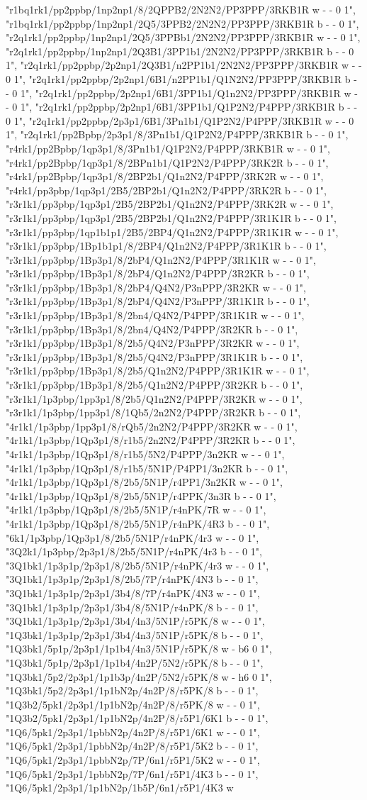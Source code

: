\documentclass[11pt,a4paper]{article}
\begin{document}
"r1bq1rk1/pp2ppbp/1np2np1/8/2QPPB2/2N2N2/PP3PPP/3RKB1R w - - 0 1", "r1bq1rk1/pp2ppbp/1np2np1/2Q5/3PPB2/2N2N2/PP3PPP/3RKB1R b - - 0 1", "r2q1rk1/pp2ppbp/1np2np1/2Q5/3PPBb1/2N2N2/PP3PPP/3RKB1R w - - 0 1", "r2q1rk1/pp2ppbp/1np2np1/2Q3B1/3PP1b1/2N2N2/PP3PPP/3RKB1R b - - 0 1", "r2q1rk1/pp2ppbp/2p2np1/2Q3B1/n2PP1b1/2N2N2/PP3PPP/3RKB1R w - - 0 1", "r2q1rk1/pp2ppbp/2p2np1/6B1/n2PP1b1/Q1N2N2/PP3PPP/3RKB1R b - - 0 1", "r2q1rk1/pp2ppbp/2p2np1/6B1/3PP1b1/Q1n2N2/PP3PPP/3RKB1R w - - 0 1", "r2q1rk1/pp2ppbp/2p2np1/6B1/3PP1b1/Q1P2N2/P4PPP/3RKB1R b - - 0 1", "r2q1rk1/pp2ppbp/2p3p1/6B1/3Pn1b1/Q1P2N2/P4PPP/3RKB1R w - - 0 1", "r2q1rk1/pp2Bpbp/2p3p1/8/3Pn1b1/Q1P2N2/P4PPP/3RKB1R b - - 0 1", "r4rk1/pp2Bpbp/1qp3p1/8/3Pn1b1/Q1P2N2/P4PPP/3RKB1R w - - 0 1", "r4rk1/pp2Bpbp/1qp3p1/8/2BPn1b1/Q1P2N2/P4PPP/3RK2R b - - 0 1", "r4rk1/pp2Bpbp/1qp3p1/8/2BP2b1/Q1n2N2/P4PPP/3RK2R w - - 0 1", "r4rk1/pp3pbp/1qp3p1/2B5/2BP2b1/Q1n2N2/P4PPP/3RK2R b - - 0 1", "r3r1k1/pp3pbp/1qp3p1/2B5/2BP2b1/Q1n2N2/P4PPP/3RK2R w - - 0 1", "r3r1k1/pp3pbp/1qp3p1/2B5/2BP2b1/Q1n2N2/P4PPP/3R1K1R b - - 0 1", "r3r1k1/pp3pbp/1qp1b1p1/2B5/2BP4/Q1n2N2/P4PPP/3R1K1R w - - 0 1", "r3r1k1/pp3pbp/1Bp1b1p1/8/2BP4/Q1n2N2/P4PPP/3R1K1R b - - 0 1", "r3r1k1/pp3pbp/1Bp3p1/8/2bP4/Q1n2N2/P4PPP/3R1K1R w - - 0 1", "r3r1k1/pp3pbp/1Bp3p1/8/2bP4/Q1n2N2/P4PPP/3R2KR b - - 0 1", "r3r1k1/pp3pbp/1Bp3p1/8/2bP4/Q4N2/P3nPPP/3R2KR w - - 0 1", "r3r1k1/pp3pbp/1Bp3p1/8/2bP4/Q4N2/P3nPPP/3R1K1R b - - 0 1", "r3r1k1/pp3pbp/1Bp3p1/8/2bn4/Q4N2/P4PPP/3R1K1R w - - 0 1", "r3r1k1/pp3pbp/1Bp3p1/8/2bn4/Q4N2/P4PPP/3R2KR b - - 0 1", "r3r1k1/pp3pbp/1Bp3p1/8/2b5/Q4N2/P3nPPP/3R2KR w - - 0 1", "r3r1k1/pp3pbp/1Bp3p1/8/2b5/Q4N2/P3nPPP/3R1K1R b - - 0 1", "r3r1k1/pp3pbp/1Bp3p1/8/2b5/Q1n2N2/P4PPP/3R1K1R w - - 0 1", "r3r1k1/pp3pbp/1Bp3p1/8/2b5/Q1n2N2/P4PPP/3R2KR b - - 0 1", "r3r1k1/1p3pbp/1pp3p1/8/2b5/Q1n2N2/P4PPP/3R2KR w - - 0 1", "r3r1k1/1p3pbp/1pp3p1/8/1Qb5/2n2N2/P4PPP/3R2KR b - - 0 1", "4r1k1/1p3pbp/1pp3p1/8/rQb5/2n2N2/P4PPP/3R2KR w - - 0 1", "4r1k1/1p3pbp/1Qp3p1/8/r1b5/2n2N2/P4PPP/3R2KR b - - 0 1", "4r1k1/1p3pbp/1Qp3p1/8/r1b5/5N2/P4PPP/3n2KR w - - 0 1", "4r1k1/1p3pbp/1Qp3p1/8/r1b5/5N1P/P4PP1/3n2KR b - - 0 1", "4r1k1/1p3pbp/1Qp3p1/8/2b5/5N1P/r4PP1/3n2KR w - - 0 1", "4r1k1/1p3pbp/1Qp3p1/8/2b5/5N1P/r4PPK/3n3R b - - 0 1", "4r1k1/1p3pbp/1Qp3p1/8/2b5/5N1P/r4nPK/7R w - - 0 1", "4r1k1/1p3pbp/1Qp3p1/8/2b5/5N1P/r4nPK/4R3 b - - 0 1", "6k1/1p3pbp/1Qp3p1/8/2b5/5N1P/r4nPK/4r3 w - - 0 1", "3Q2k1/1p3pbp/2p3p1/8/2b5/5N1P/r4nPK/4r3 b - - 0 1", "3Q1bk1/1p3p1p/2p3p1/8/2b5/5N1P/r4nPK/4r3 w - - 0 1", "3Q1bk1/1p3p1p/2p3p1/8/2b5/7P/r4nPK/4N3 b - - 0 1", "3Q1bk1/1p3p1p/2p3p1/3b4/8/7P/r4nPK/4N3 w - - 0 1", "3Q1bk1/1p3p1p/2p3p1/3b4/8/5N1P/r4nPK/8 b - - 0 1", "3Q1bk1/1p3p1p/2p3p1/3b4/4n3/5N1P/r5PK/8 w - - 0 1", "1Q3bk1/1p3p1p/2p3p1/3b4/4n3/5N1P/r5PK/8 b - - 0 1", "1Q3bk1/5p1p/2p3p1/1p1b4/4n3/5N1P/r5PK/8 w - b6 0 1", "1Q3bk1/5p1p/2p3p1/1p1b4/4n2P/5N2/r5PK/8 b - - 0 1", "1Q3bk1/5p2/2p3p1/1p1b3p/4n2P/5N2/r5PK/8 w - h6 0 1", "1Q3bk1/5p2/2p3p1/1p1bN2p/4n2P/8/r5PK/8 b - - 0 1", "1Q3b2/5pk1/2p3p1/1p1bN2p/4n2P/8/r5PK/8 w - - 0 1", "1Q3b2/5pk1/2p3p1/1p1bN2p/4n2P/8/r5P1/6K1 b - - 0 1", "1Q6/5pk1/2p3p1/1pbbN2p/4n2P/8/r5P1/6K1 w - - 0 1", "1Q6/5pk1/2p3p1/1pbbN2p/4n2P/8/r5P1/5K2 b - - 0 1", "1Q6/5pk1/2p3p1/1pbbN2p/7P/6n1/r5P1/5K2 w - - 0 1", "1Q6/5pk1/2p3p1/1pbbN2p/7P/6n1/r5P1/4K3 b - - 0 1", "1Q6/5pk1/2p3p1/1p1bN2p/1b5P/6n1/r5P1/4K3 w 
\end{document}
